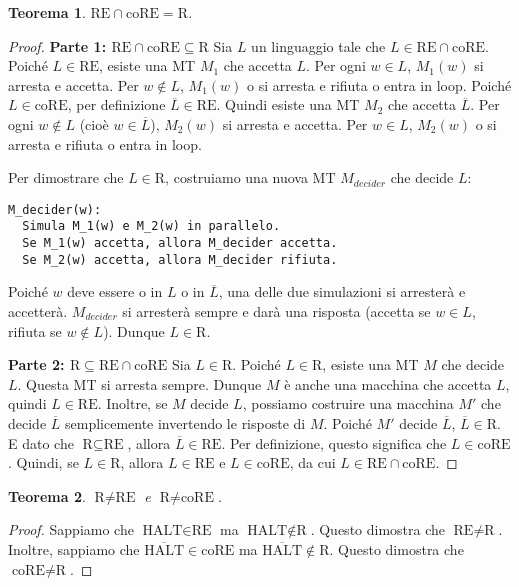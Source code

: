 \documentclass[a4paper, 11pt]{book} %
\newtheorem{theorem}{Teorema}[section]
\theoremstyle{definition}
\begin{document}
\begin{theorem}
$\text{RE} \cap \text{coRE} = \text{R}$.
\end{theorem}
\begin{proof}
\textbf{Parte 1: $\text{RE} \cap \text{coRE} \subseteq \text{R}$}
Sia $L$ un linguaggio tale che $L \in \text{RE} \cap \text{coRE}$.
Poiché $L \in \text{RE}$, esiste una MT $M_1$ che accetta $L$. Per ogni $w \in L$, $M_1(w)$ si arresta e accetta. Per $w \notin L$, $M_1(w)$ o si arresta e rifiuta o entra in loop.
Poiché $L \in \text{coRE}$, per definizione $\overline{L} \in \text{RE}$. Quindi esiste una MT $M_2$ che accetta $\overline{L}$. Per ogni $w \notin L$ (cioè $w \in \overline{L}$), $M_2(w)$ si arresta e accetta. Per $w \in L$, $M_2(w)$ o si arresta e rifiuta o entra in loop.

Per dimostrare che $L \in \text{R}$, costruiamo una nuova MT $M_{decider}$ che decide $L$:
\begin{verbatim}
M_decider(w):
  Simula M_1(w) e M_2(w) in parallelo.
  Se M_1(w) accetta, allora M_decider accetta.
  Se M_2(w) accetta, allora M_decider rifiuta.
\end{verbatim}
Poiché $w$ deve essere o in $L$ o in $\overline{L}$, una delle due simulazioni si arresterà e accetterà. $M_{decider}$ si arresterà sempre e darà una risposta (accetta se $w \in L$, rifiuta se $w \notin L$). Dunque $L \in \text{R}$.

\textbf{Parte 2: $\text{R} \subseteq \text{RE} \cap \text{coRE}$}
Sia $L \in \text{R}$.
Poiché $L \in \text{R}$, esiste una MT $M$ che decide $L$. Questa MT si arresta sempre. Dunque $M$ è anche una macchina che accetta $L$, quindi $L \in \text{RE}$.
Inoltre, se $M$ decide $L$, possiamo costruire una macchina $M'$ che decide $\overline{L}$ semplicemente invertendo le risposte di $M$. Poiché $M'$ decide $\overline{L}$, $\overline{L} \in \text{R}$. E dato che $\text{R} \subseteq \text{RE}$, allora $\overline{L} \in \text{RE}$. Per definizione, questo significa che $L \in \text{coRE}$.
Quindi, se $L \in \text{R}$, allora $L \in \text{RE}$ e $L \in \text{coRE}$, da cui $L \in \text{RE} \cap \text{coRE}$.
\end{proof}

\begin{theorem}
$\text{R} \neq \text{RE}$ e $\text{R} \neq \text{coRE}$.
\end{theorem}
\begin{proof}
Sappiamo che $\text{HALT} \in \text{RE}$ ma $\text{HALT} \notin \text{R}$. Questo dimostra che $\text{RE} \neq \text{R}$.
Inoltre, sappiamo che $\overline{\text{HALT}} \in \text{coRE}$ ma $\overline{\text{HALT}} \notin \text{R}$. Questo dimostra che $\text{coRE} \neq \text{R}$.
\end{proof}
\end{document}
